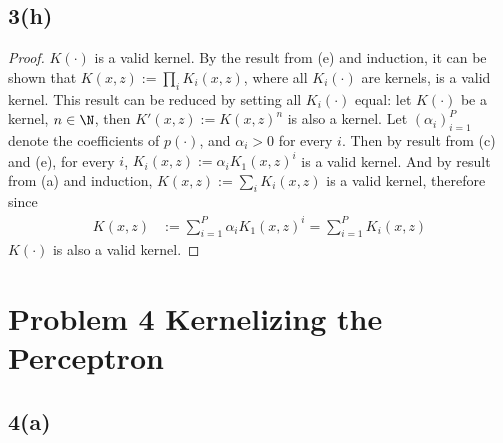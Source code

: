 \documentclass[11pt]{article}
\begin{document}
	\subsection{3(h)}
	\begin{proof}
		$K(\cdot)$ is a valid kernel. By the result from (e) and induction, it can be shown that $K(x, z) := \prod_i K_i(x, z)$, where all $K_i(\cdot)$ are kernels, is a valid kernel. This result can be reduced by setting all $K_i(\cdot)$ equal: let $K(\cdot)$ be a kernel, $n \in \N$, then $K'(x,z):=K(x,z)^n$ is also a kernel. Let $(\alpha_i)_{i=1}^P$ denote the coefficients of $p(\cdot)$, and $\alpha_i > 0$ for every $i$. Then by result from (c) and (e), for every $i$, $K_i(x, z) := \alpha_i K_1(x, z)^i$ is a valid kernel. And by result from (a) and induction, $K(x, z) := \sum_i K_i(x, z)$ is a valid kernel, therefore since
		\begin{align}
			K(x,z) &:= \sum_{i=1}^P \alpha_i K_1(x,z)^i = \sum_{i=1}^P K_i(x, z)
		\end{align}
		$K(\cdot)$ is also a valid kernel.
	\end{proof}
		
	\newpage
	\section{Problem 4 Kernelizing the Perceptron}
	\subsection{4(a)}
\end{document}
